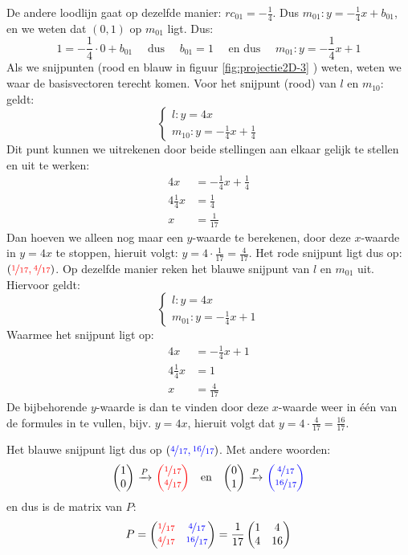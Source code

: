 De andere loodlijn gaat op dezelfde manier: $rc_{01}= -\frac{1}{4}$. Dus $m_{01}: y=-\frac{1}{4}x + b_{01}$, en we weten dat $(0,1)$ op $m_{01}$ ligt. Dus: \[1=-\frac{1}{4}\cdot 0 + b_{01} \quad \text{ dus } \quad b_{01} = 1 \quad \text{ en dus } \quad m_{01}: y=-\frac{1}{4}x+1\] Als we snijpunten (rood en blauw in figuur \ref{fig:projectie2D-3} ) weten, weten we waar de basisvectoren terecht komen. Voor het snijpunt (rood) van  $l$ en $m_{10}:$ geldt:
\[
    \begin{cases}
        l: y=4x \\
        m_{10}: y =-\frac{1}{4}x + \frac{1}{4}
    \end{cases}
\] 
Dit punt kunnen we uitrekenen door beide stellingen aan elkaar gelijk te stellen en uit te werken:
\begin{align*}
    4x &=-\frac{1}{4}x + \frac{1}{4} \\
    4\frac{1}{4}x &= \frac{1}{4} \\
    x &= \frac{1}{17}
\end{align*}
Dan hoeven we alleen nog maar een $y$-waarde te berekenen, door deze $x$-waarde in $y=4x$ te stoppen, hieruit volgt: $y=4\cdot\frac{1}{17}=\frac{4}{17}$. Het rode snijpunt ligt dus op: $({\color{red}\nicefrac{1}{17},\nicefrac{4}{17}})$.
Op dezelfde manier reken het blauwe snijpunt van  $l$ en $ m_{01}$ uit. Hiervoor geldt:
\[
    \begin{cases}
        l: y=4x \\
        m_{01}: y=-\frac{1}{4}x+1
    \end{cases}
\] 
Waarmee het snijpunt ligt op:
\begin{align*}
    4x &= -\frac{1}{4}x + 1 \\
    4\frac{1}{4}x &= 1 \\
    x &= \frac{4}{17}
\end{align*}
De bijbehorende $y$-waarde is dan te vinden door deze $x$-waarde weer in één van de formules in te vullen, bijv. $y=4x$, hieruit volgt dat $y=4\cdot\frac{4}{17}=\frac{16}{17}$.

Het blauwe snijpunt ligt dus op $({\color{blue}\nicefrac{4}{17},\nicefrac{16}{17}})$. Met andere woorden:
\[ 
    \vectwee{1}{0}\ \xrightarrow{P}\ \vectwee[red]{\nicefrac{1}{17}}{\nicefrac{4}{17}} \quad \text{en} \quad 
    \vectwee{0}{1}\ \xrightarrow{P}\ \vectwee[blue]{\nicefrac{4}{17}}{\nicefrac{16}{17}}
\]
en dus is de matrix van $P$:
\[
    P = \begin{pmatrix} {\color{red}\nicefrac{1}{17}}&{\color{blue}\nicefrac{4}{17}} \\ {\color{red}\nicefrac{4}{17}}&{\color{blue}\nicefrac{16}{17}} \end{pmatrix} = \frac{1}{17}\begin{pmatrix} 1&4 \\ 4&16 \end{pmatrix}
\]

